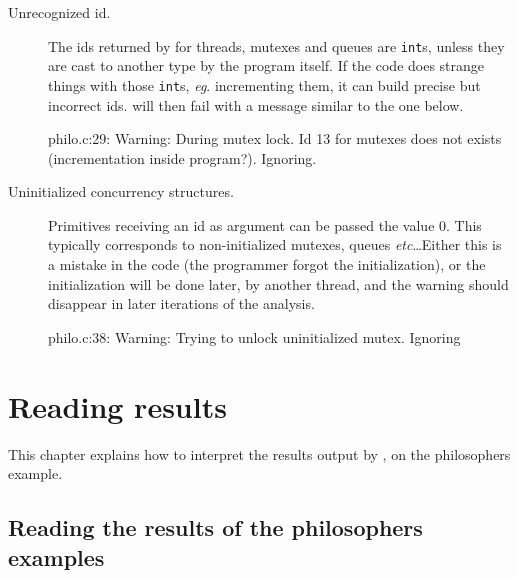 \documentclass{frama-c-book}
\def\etc{\emph{etc}\ldots}
\def\eg.{\emph{eg}.}
\begin{document}
\begin{description}
\item[Unrecognized id.] The ids returned by \mthread for threads,
  mutexes and queues are \C \verb+int+s, unless they are cast to
  another type by the program itself. If the code does strange things
  with those \verb+int+s, \eg. incrementing them, it can build precise
  but incorrect ids. \mthread will then fail with a message similar to
  the one below.
  \begin{logs}
[eva] philo.c:29: Warning: During mutex lock. Id 13 for mutexes does not
                exists (incrementation inside program?). Ignoring.
  \end{logs}

\item[Uninitialized concurrency structures.]

Primitives receiving an id as argument can be passed the value 0. This
typically corresponds to non-initialized mutexes, queues \etc Either
this is a mistake in the code (the programmer forgot the initialization),
or the initialization will be done later, by another thread, and the
warning should disappear in later iterations of the analysis.

\begin{logs}
[eva] philo.c:38: Warning: Trying to unlock uninitialized mutex. Ignoring
\end{logs}

\end{description}




\chapter{Reading \mthread results}
\label{chap:results}

This chapter explains how to interpret the results output by
\mthread, on the  philosophers example.


\section{Reading the results of the philosophers examples}
\label{sec:results-philo}
\end{document}
